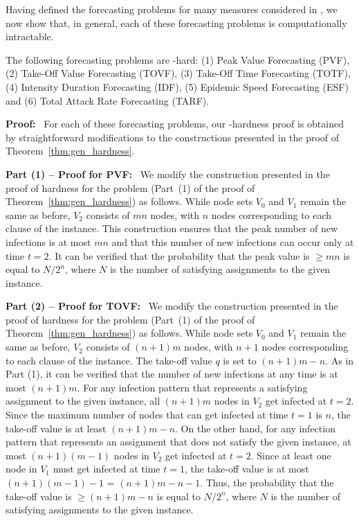 Having defined the forecasting problems for many measures considered in \cite{TC+2016},
we now show that, in general, each of these forecasting problems is 
computationally intractable.

\begin{theorem}\label{thm:hardness_new_measures}
The following forecasting problems are \cnump-hard:
(1) Peak Value Forecasting (PVF),
(2) Take-Off Value Forecasting (TOVF),
(3) Take-Off Time Forecasting (TOTF),
(4) Intensity Duration Forecasting (IDF),
(5) Epidemic Speed Forecasting (ESF) and
(6) Total Attack Rate Forecasting (TARF).
\end{theorem}

\medskip
\noindent
\textbf{Proof:}~ For each of these forecasting problems, our \cnump-hardness proof
is obtained by straightforward modifications to the constructions presented in
the proof of Theorem~\ref{thm:gen_hardness}.

\medskip
\noindent
\textbf{Part (1) -- Proof for PVF:}~ We modify 
the construction presented in the proof of hardness for the \tNewInfs{}
problem (Part~(1) of the proof of Theorem~\ref{thm:gen_hardness}) as follows.  
While node sets $V_0$ and $V_1$ remain the same as before, $V_2$ consists
of $mn$ nodes, with $n$ nodes corresponding to each clause of the \mtsat{}
instance.
This construction ensures that the peak number of new infections 
is at most $mn$ and that this number of new infections can occur
only at time $t = 2$. 
It can be verified that the probability that the peak value is $\geq mn$ is
equal to $N/2^n$, where $N$ is the number of satisfying assignments to the
given \mtsat{} instance.


\medskip
\noindent
\textbf{Part (2) -- Proof for TOVF:}~ We modify 
the construction presented in the proof of hardness for the \tNewInfs{}
problem (Part~(1) of the proof of Theorem~\ref{thm:gen_hardness}) as follows.  
While node sets $V_0$ and $V_1$ remain the same as before, $V_2$ consists
of $(n+1)m$ nodes, with $n+1$ nodes corresponding to each clause of the \mtsat{}
instance.
The take-off value $q$ is set to $(n+1)m-n$.
As in Part (1), it can be verified that the number of new infections
at any time is at most $(n+1)m$.
For any infection pattern that represents a satisfying assignment to the
given \mtsat{} instance, all $(n+1)m$ nodes in $V_2$ get infected 
at $t = 2$. 
Since the maximum number of nodes that can get infected at time $t = 1$ is $n$,
the take-off value is at least $(n+1)m-n$.
On the other hand,
for any infection pattern that represents an assignment that does not satisfy the
given \mtsat{} instance, at most $(n+1)(m-1)$ nodes in $V_2$ get infected 
at $t = 2$. 
Since at least one node in $V_1$ must get infected at time $t = 1$, 
the take-off value  is at most $(n+1)(m-1)-1$ = $(n+1)m - n -1$.
Thus, the probability that the take-off value is $\geq (n+1)m-n$ is
equal to $N/2^n$, where $N$ is the number of satisfying assignments to the
given \mtsat{} instance.

